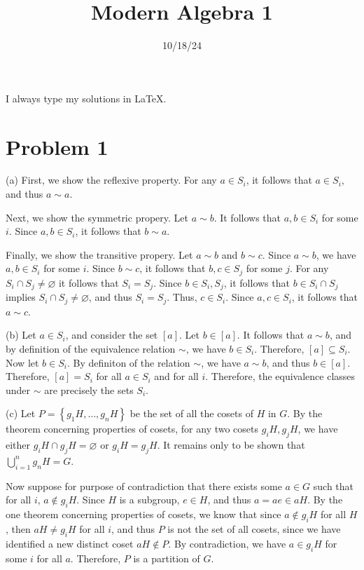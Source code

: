 \documentclass[11pt, letterpaper]{article}
\title{Modern Algebra 1}
\date{10/18/24}
\begin{document}
\makeproblem
I always type my solutions in LaTeX.
\section*{Problem 1}
\begin{solution}
	(a) First, we show the reflexive property. For any $a\in S_ i$, it follows that $a\in S_i$, and thus $a\sim a$.

	Next, we show the symmetric propery. Let $a\sim b$. It follows that $a,b\in S_i$ for some $i$. Since $a,b\in S_i$, it follows that $b\sim a$.

	Finally, we show the transitive propery. Let $a\sim b$ and $b\sim c$. Since $a\sim b$, we have $a,b\in S_i$ for some $i$. Since $b\sim c$, it follows that $b,c\in S_j$ for some $j$. For any $S_i \cap S_j \neq \varnothing$ it follows that $S_i=S_j$. Since $b\in S_i,S_j$, it follows that $b\in S_i\cap S_j$ implies $S_i\cap S_j\neq \varnothing$, and thus $S_i=S_j$. Thus, $c\in S_i$. Since $a,c\in S_i$, it follows that $a\sim c$.

	(b) Let $a\in S_i$, and consider the set $[a]$.  Let $b\in [a]$. It follows that $a\sim b$, and by definition of the equivalence relation $\sim $, we have $b\in S_i$. Therefore, $[a]\subseteq S_i$. Now let $b\in S_i$. By definiton of the relation $\sim $, we have $a\sim b$, and thus $b\in [a]$. Therefore, $[a]=S_i$ for all $a\in S_i$ and for all $i$. Therefore, the equivalence classes under $\sim $ are precisely the sets $S_i$.

	(c) Let $P=\left\{ g_1H, \ldots,g_nH \right\} $ be the set of all the cosets of $H$ in $G$. By the theorem concerning properties of cosets, for any two cosets $g_iH,g_jH$, we have either $g_iH\cap g_jH=\varnothing$ or $g_iH=g_jH$. It remains only to be shown that $\bigcup_{i=1}^{n} g_nH=G$.

	Now suppose for purpose of contradiction that there exists some $a\in G$ such that for all $i$, $a\notin g_iH$. Since $H$ is a subgroup, $e\in H$, and thus $a=ae\in aH$. By the one theorem concerning properties of cosets, we know that since $a\notin g_iH$ for all $H$, then $aH\neq g_iH$ for all $i$, and thus $P$ is not the set of all cosets, since we have identified a new distinct coset $aH\notin P$. By contradiction, we have $a\in g_iH$ for some $i$ for all $a$. Therefore, $P$ is a partition of $G$.
\end{solution}
\end{document}
